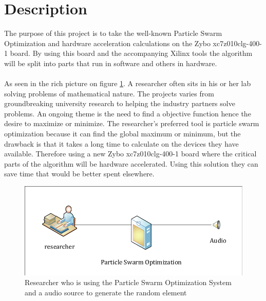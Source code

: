 \section{Description}
The purpose of this project is to take the well-known Particle Swarm Optimization \cite{Blondin2009} and hardware acceleration calculations on the Zybo xc7z010clg-400-1 board. By using this board and the accompanying Xilinx tools the algorithm will be split into parts that run in software and others in hardware. 
\\\\
As seen in the rich picture on figure \ref{fig:descriptiondiagram}. A researcher often sits in his or her lab solving problems of mathematical nature. The projects varies from groundbreaking university research to helping the industry partners solve problems. An ongoing theme is the need to find a objective function hence the desire to maximize or minimize.
The researcher's preferred tool is particle swarm optimization because it can find the global maximum or minimum, but the drawback is that it takes a long time to calculate on the devices they have available. Therefore using a new Zybo xc7z010clg-400-1 board where the critical parts of the algorithm will be hardware accelerated. Using this solution they can save time that would be better spent elsewhere.

\begin{figure}[!h]
	\centering
	\includegraphics[width=0.7\linewidth]{diagram/description_diagram}
	\caption{Researcher who is using the Particle Swarm Optimization System and a audio source to generate the random element }
	\label{fig:descriptiondiagram}
\end{figure}